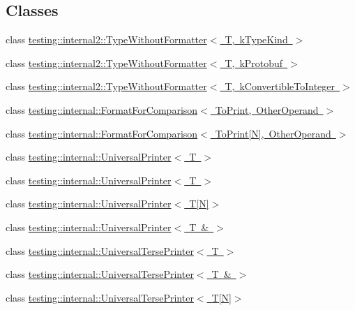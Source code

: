 \subsection*{Classes}
\begin{DoxyCompactItemize}
\item 
class \mbox{\hyperlink{classtesting_1_1internal2_1_1_type_without_formatter}{testing\+::internal2\+::\+Type\+Without\+Formatter$<$ T, k\+Type\+Kind $>$}}
\item 
class \mbox{\hyperlink{classtesting_1_1internal2_1_1_type_without_formatter_3_01_t_00_01k_protobuf_01_4}{testing\+::internal2\+::\+Type\+Without\+Formatter$<$ T, k\+Protobuf $>$}}
\item 
class \mbox{\hyperlink{classtesting_1_1internal2_1_1_type_without_formatter_3_01_t_00_01k_convertible_to_integer_01_4}{testing\+::internal2\+::\+Type\+Without\+Formatter$<$ T, k\+Convertible\+To\+Integer $>$}}
\item 
class \mbox{\hyperlink{classtesting_1_1internal_1_1_format_for_comparison}{testing\+::internal\+::\+Format\+For\+Comparison$<$ To\+Print, Other\+Operand $>$}}
\item 
class \mbox{\hyperlink{classtesting_1_1internal_1_1_format_for_comparison_3_01_to_print[_n]_00_01_other_operand_01_4}{testing\+::internal\+::\+Format\+For\+Comparison$<$ To\+Print\mbox{[}\+N\mbox{]}, Other\+Operand $>$}}
\item 
class \mbox{\hyperlink{classtesting_1_1internal_1_1_universal_printer}{testing\+::internal\+::\+Universal\+Printer$<$ T $>$}}
\item 
class \mbox{\hyperlink{classtesting_1_1internal_1_1_universal_printer}{testing\+::internal\+::\+Universal\+Printer$<$ T $>$}}
\item 
class \mbox{\hyperlink{classtesting_1_1internal_1_1_universal_printer_3_01_t[_n]_4}{testing\+::internal\+::\+Universal\+Printer$<$ T\mbox{[}\+N\mbox{]}$>$}}
\item 
class \mbox{\hyperlink{classtesting_1_1internal_1_1_universal_printer_3_01_t_01_6_01_4}{testing\+::internal\+::\+Universal\+Printer$<$ T \& $>$}}
\item 
class \mbox{\hyperlink{classtesting_1_1internal_1_1_universal_terse_printer}{testing\+::internal\+::\+Universal\+Terse\+Printer$<$ T $>$}}
\item 
class \mbox{\hyperlink{classtesting_1_1internal_1_1_universal_terse_printer_3_01_t_01_6_01_4}{testing\+::internal\+::\+Universal\+Terse\+Printer$<$ T \& $>$}}
\item 
class \mbox{\hyperlink{classtesting_1_1internal_1_1_universal_terse_printer_3_01_t[_n]_4}{testing\+::internal\+::\+Universal\+Terse\+Printer$<$ T\mbox{[}\+N\mbox{]}$>$}}

\end{DoxyCompactItemize}
